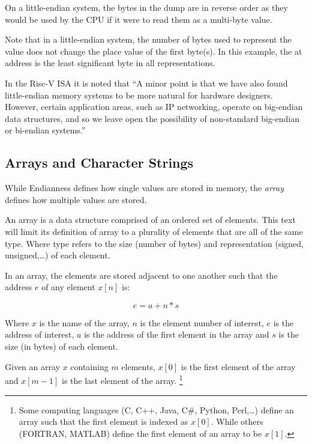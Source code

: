 \begin{tcolorbox}
On a little-endian system, the bytes in the dump are in reverse order as 
they would be used by the CPU if it were to read them as a multi-byte value.
\end{tcolorbox}

Note that in a little-endian system, the number of bytes used to represent
the value does not change the place value of the first byte(s).  In this
example, the  at address  is the least significant
byte in all representations.  

In the Risc-V ISA it is noted that ``A minor point is that we have also found 
little-endian memory systems to be more natural for hardware 
designers. However, certain application areas, such as IP networking, operate
on big-endian data structures, and so we leave open the possibility of 
non-standard big-endian or bi-endian systems.''\cite[p.~6]{rvismv1v22:2017}

\subsection{Arrays and Character Strings}

While Endianness defines how single values are stored in memory,
the {\em array} defines how multiple values are stored.

An array is a data structure comprised of an ordered set of elements.
This text will limit its definition of array to a plurality of
elements that are all of the same type.  Where type
refers to the size (number of bytes) and representation (signed,
unsigned,\ldots) of each element.

In an array, the elements are stored adjacent to one another such that the
address $e$ of any element $x[n]$ is:

\begin{equation}
e = a + n * s
\end{equation}

Where $x$ is the name of the array, $n$ is the element number of interest, 
$e$ is the address of interest, $a$ is the address of the first element in 
the array and $s$ is the size (in bytes) of each element.

Given an array $x$ containing $m$ elements, $x[0]$ is the first element of 
the array and $x[m-1]$ is the last element of the array.%
\footnote{Some computing languages (C, C++, Java, C\#, Python, Perl,\ldots) 
define an array such that the first element is indexed as $x[0]$.  
While others (FORTRAN, MATLAB) define the first element of an 
array to be $x[1]$.}

